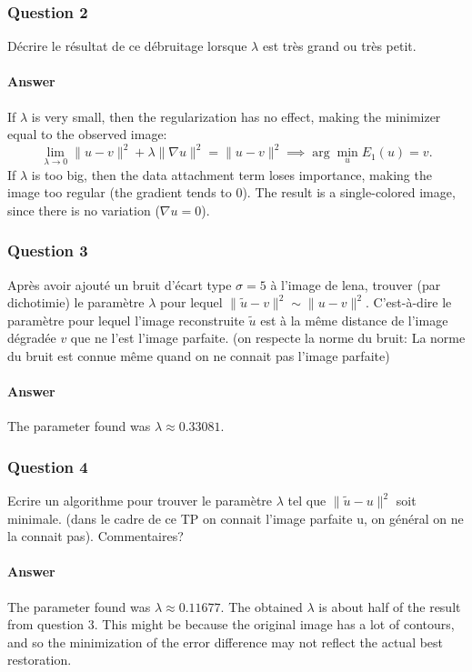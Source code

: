 \documentclass{article}
\begin{document}
    \subsubsection*{Question 2}
    Décrire le résultat de ce débruitage lorsque $\lambda$ est très grand ou très petit.

    \paragraph{Answer}
    If $\lambda$ is very small, then the regularization has no effect, making the minimizer equal to the observed image:
    \[
        \lim_{\lambda \to 0} \| u - v \|^2 + \lambda \| \nabla u \|^2 = \| u - v \|^2 \implies \arg \min_u E_1(u) = v.
    \]
    If $\lambda$ is too big, then the data attachment term loses importance, making the image too regular (the gradient tends to 0). The result is a single-colored image, since there is no variation ($\nabla u = 0$).


    \subsubsection*{Question 3}
    Après avoir ajouté un bruit d’écart type $\sigma = 5$ à l’image de lena, trouver (par dichotimie) le paramètre $\lambda$ pour lequel $\| \tilde{u} - v \|^2 \sim \|u - v\|^2$. C’est-à-dire le paramètre pour lequel l’image reconstruite $\tilde{u}$ est à la même distance de l’image dégradée $v$ que ne l’est l’image parfaite. (on respecte la norme du bruit: La norme du bruit est connue même quand on ne connait pas l’image parfaite)

    \paragraph{Answer}
    The parameter found was $\lambda \approx 0.33081$.

    \subsubsection*{Question 4}
    Ecrire un algorithme pour trouver le paramètre $\lambda$ tel que $\| \tilde{u} - u \|^2$ soit minimale. (dans le cadre de ce TP on connait l’image parfaite u, on général on ne la connait pas). Commentaires?

    \paragraph{Answer}
    The parameter found was $\lambda \approx 0.11677$.
    The obtained $\lambda$ is about half of the result from question 3. This might be because the original image has a lot of contours, and so the minimization of the error difference may not reflect the actual best restoration.
\end{document}
